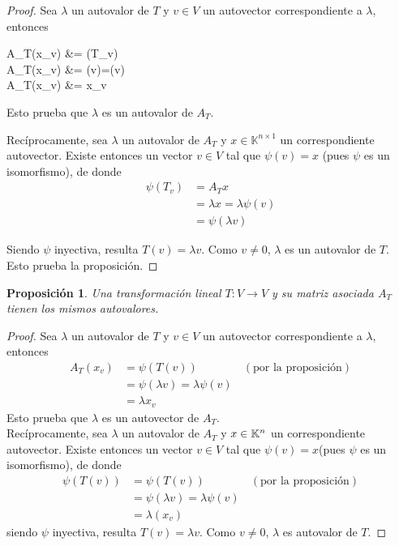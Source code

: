 \documentclass[b5paper, 11pt]{book}
\newcommand{\0}{\mathbf{0}}
\theoremstyle{estiloB}
\theoremstyle{estiloC}
\theoremstyle{estiloD}
\newtheorem{proposition}{Proposición}[section]
\begin{document}
\begin{proof}
	Sea $\lambda$ un autovalor de $T$ y $v\in V$ un autovector correspondiente a $\lambda$, entonces
	\begin{flalign*}
	A_{T}(x_{v}) &= \psi(T_{v})\\
	A_{T}(x_{v}) &= \psi(\lambda v)=\lambda\psi(v)\\
	A_{T}(x_{v}) &= \lambda x_{v}
	\end{flalign*}
	Esto prueba que $\lambda$ es un autovalor de $A_{T}.$
	
	Recíprocamente, sea $\lambda$ un autovalor de $A_{T}$ y $x\in\mathbb{K}^{n\times 1}$ un correspondiente autovector. Existe entonces un vector $v\in V$ tal que $\psi(v)=x$ (pues $\psi$ es un isomorfismo), de donde
	\begin{align*}
	\psi(T_{v}) &= A_{T}x \\
	&= \lambda x = \lambda\psi(v)\\
	&= \psi(\lambda v)
	\end{align*}
	
	Siendo $\psi$ inyectiva, resulta $T(v)  = \lambda v$. Como $v \neq0$, $\lambda$ es un autovalor de $T$. Esto prueba la proposición.
	
\end{proof}

\begin{proposition}
	Una transformación lineal $T: V \rightarrow V$ y su matriz asociada $A_{T}$ tienen  los mismos autovalores.
\end{proposition}

\begin{proof}
	Sea $\lambda$ un autovalor de $T$ y $v \in V$ un autovector correspondiente a $\lambda$, entonces
	\begin{align*}
	A_{T}(x_{v})	& = \psi(T(v)) \qquad\qquad(\text{por la proposición})\\
	& = \psi(\lambda v) = \lambda \psi(v)\\
	& = \lambda x_{v}
	\end{align*}
	Esto prueba que $\lambda$ es un autovector de $A_{T}$. \\
	Recíprocamente, sea $\lambda$ un autovalor de $A_{T}$ y $x \in \mathbb{K}^{n \time 1}$ un correspondiente autovector. Existe entonces un vector $v \in V$ tal que $\psi(v) = x$(pues $\psi$ es un isomorfismo), de donde
	\begin{align*}
	\psi(T(v)) & =  \psi(T(v))\qquad\qquad(\text{por la proposición})\\
	& = \psi(\lambda v) = \lambda \psi(v)\\
	& = \lambda (x_{v})
	\end{align*}
	siendo $\psi$ inyectiva, resulta $T(v) = \lambda v$. Como $v \neq 0$, $\lambda$ es autovalor de $T$.
\end{proof}
\end{document}
